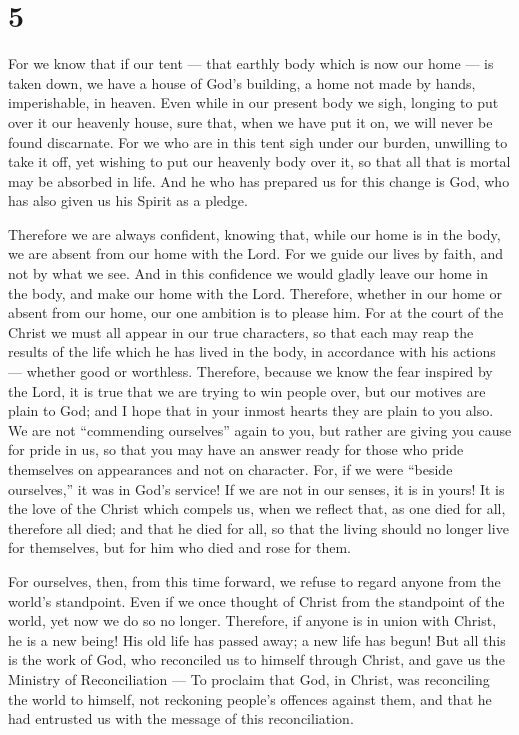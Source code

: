 \hypertarget{section-4}{%
\section{5}\label{section-4}}

 For we know that if our tent --- that earthly body which is
now our home --- is taken down, we have a house of God's building, a
home not made by hands, imperishable, in heaven.  Even while
in our present body we sigh, longing to put over it our heavenly house,
 sure that, when we have put it on, we will never be found
discarnate.  For we who are in this tent sigh under our
burden, unwilling to take it off, yet wishing to put our heavenly body
over it, so that all that is mortal may be absorbed in life.
 And he who has prepared us for this change is God, who has
also given us his Spirit as a pledge.

 Therefore we are always confident, knowing that, while our
home is in the body, we are absent from our home with the Lord.
 For we guide our lives by faith, and not by what we see.
 And in this confidence we would gladly leave our home in
the body, and make our home with the Lord.  Therefore,
whether in our home or absent from our home, our one ambition is to
please him.  For at the court of the Christ we must all
appear in our true characters, so that each may reap the results of the
life which he has lived in the body, in accordance with his actions ---
whether good or worthless.  Therefore, because we know the
fear inspired by the Lord, it is true that we are trying to win people
over, but our motives are plain to God; and I hope that in your inmost
hearts they are plain to you also.  We are not ``commending
ourselves'' again to you, but rather are giving you cause for pride in
us, so that you may have an answer ready for those who pride themselves
on appearances and not on character.  For, if we were
``beside ourselves,'' it was in God's service! If we are not in our
senses, it is in yours!  It is the love of the Christ which
compels us, when we reflect that, as one died for all, therefore all
died;  and that he died for all, so that the living should
no longer live for themselves, but for him who died and rose for them.

 For ourselves, then, from this time forward, we refuse to
regard anyone from the world's standpoint. Even if we once thought of
Christ from the standpoint of the world, yet now we do so no longer.
 Therefore, if anyone is in union with Christ, he is a new
being! His old life has passed away; a new life has begun! 
But all this is the work of God, who reconciled us to himself through
Christ, and gave us the Ministry of Reconciliation ---  To
proclaim that God, in Christ, was reconciling the world to himself, not
reckoning people's offences against them, and that he had entrusted us
with the message of this reconciliation.

